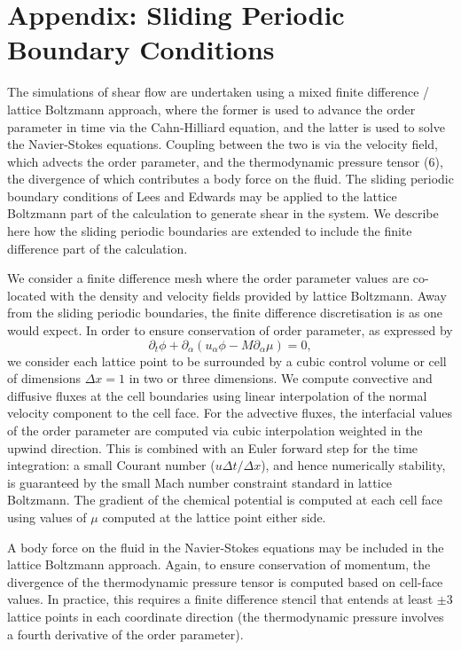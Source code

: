 \documentclass[8.5pt,twoside,twocolumn]{article}
\begin{document}
\section{Appendix: Sliding Periodic Boundary Conditions}

The simulations of shear flow are undertaken using a mixed finite
difference / lattice Boltzmann approach, where the former is used
to advance the order parameter in time via the Cahn-Hilliard equation,
and the latter is used to solve the Navier-Stokes equations.
Coupling between the two is
via the velocity field, which advects the order parameter, and
the thermodynamic pressure tensor (6), the divergence of which
contributes a body force on the fluid. The sliding periodic
boundary conditions of Lees and Edwards\cite{leesedwards} may be
applied to the lattice Boltzmann part of the calculation
\cite{Wagner02,Adhikari05} to generate shear in the system. We
describe here how the sliding periodic boundaries are extended to
include the finite difference part of the calculation.

We consider a finite difference mesh where the order parameter
values are co-located with the density and velocity fields provided
by lattice Boltzmann. Away from the sliding periodic boundaries, the
finite difference discretisation is as one would expect.
In order to ensure conservation of order parameter, as expressed by
\begin{equation}
\partial_t \phi + \partial_\alpha (u_\alpha \phi - M\partial_\alpha \mu) = 0,
\end{equation}
we consider each lattice point to be surrounded by a cubic control volume or
cell
of dimensions $\Delta x = 1$ in two or three dimensions.
We compute convective and diffusive fluxes at the cell boundaries using
linear interpolation of the normal velocity component to the cell face.
For the advective fluxes, the interfacial values of the order parameter
are computed via cubic interpolation weighted in the upwind direction.
This is combined with an Euler forward step for the time integration:
a small Courant number ($u\Delta t/\Delta x$), and hence numerically
stability, is guaranteed by the small Mach number constraint
standard in lattice Boltzmann. The gradient of the chemical potential
is computed at each cell face using values of $\mu$ computed at the
lattice point either side.

A body force on the fluid in the Navier-Stokes equations may be
included in the lattice Boltzmann approach. Again, to ensure conservation
of momentum, the divergence of the thermodynamic pressure tensor is
computed based on cell-face values. In practice, this requires a
finite difference stencil
that entends at least $\pm 3$ lattice points in each coordinate direction
(the thermodynamic pressure involves a fourth derivative of the order
parameter).
\end{document}

